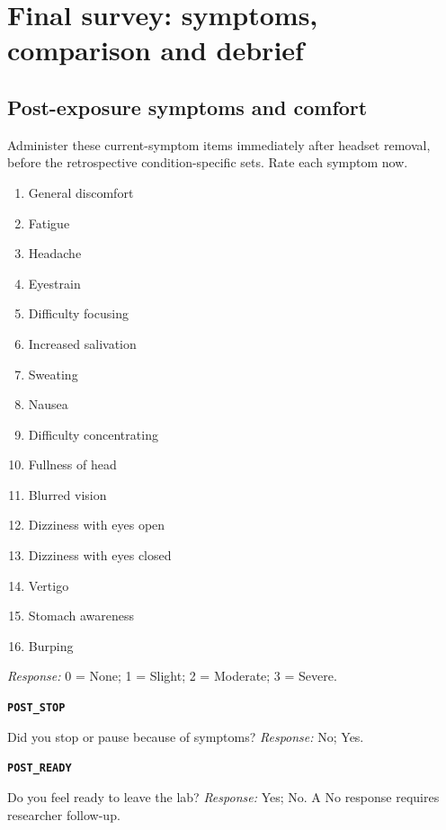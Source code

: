 \documentclass[11pt,letterpaper]{article}
\newcommand{\qid}[1]{\par\smallskip\textbf{\texttt{#1}}\par}
\begin{document}
\section{Final survey: symptoms, comparison and debrief}
\subsection{Post-exposure symptoms and comfort}
Administer these current-symptom items immediately after headset removal, before the retrospective condition-specific sets. Rate each symptom now.
\begin{enumerate}
\item General discomfort
\item Fatigue
\item Headache
\item Eyestrain
\item Difficulty focusing
\item Increased salivation
\item Sweating
\item Nausea
\item Difficulty concentrating
\item Fullness of head
\item Blurred vision
\item Dizziness with eyes open
\item Dizziness with eyes closed
\item Vertigo
\item Stomach awareness
\item Burping
\end{enumerate}
\textit{Response:} 0 = None; 1 = Slight; 2 = Moderate; 3 = Severe.
\qid{POST\_STOP}
Did you stop or pause because of symptoms?
\textit{Response:} No; Yes.
\qid{POST\_READY}
Do you feel ready to leave the lab?
\textit{Response:} Yes; No. A No response requires researcher follow-up.
\end{document}
